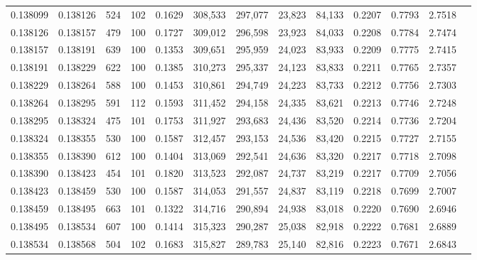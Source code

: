 \begin{tabular}{rrrrrrrrrrrrr}
0.138099 & 0.138126 &   524 & 102 &                                     0.1629 & 308,533 & 297,077 &  23,823 &  84,133 & 0.2207 & 0.7793 & 2.7518 \\
0.138126 & 0.138157 &   479 & 100 &                                     0.1727 & 309,012 & 296,598 &  23,923 &  84,033 & 0.2208 & 0.7784 & 2.7474 \\
0.138157 & 0.138191 &   639 & 100 &                                     0.1353 & 309,651 & 295,959 &  24,023 &  83,933 & 0.2209 & 0.7775 & 2.7415 \\
0.138191 & 0.138229 &   622 & 100 &                                     0.1385 & 310,273 & 295,337 &  24,123 &  83,833 & 0.2211 & 0.7765 & 2.7357 \\
0.138229 & 0.138264 &   588 & 100 &                                     0.1453 & 310,861 & 294,749 &  24,223 &  83,733 & 0.2212 & 0.7756 & 2.7303 \\
0.138264 & 0.138295 &   591 & 112 &                                     0.1593 & 311,452 & 294,158 &  24,335 &  83,621 & 0.2213 & 0.7746 & 2.7248 \\
0.138295 & 0.138324 &   475 & 101 &                                     0.1753 & 311,927 & 293,683 &  24,436 &  83,520 & 0.2214 & 0.7736 & 2.7204 \\
0.138324 & 0.138355 &   530 & 100 &                                     0.1587 & 312,457 & 293,153 &  24,536 &  83,420 & 0.2215 & 0.7727 & 2.7155 \\
0.138355 & 0.138390 &   612 & 100 &                                     0.1404 & 313,069 & 292,541 &  24,636 &  83,320 & 0.2217 & 0.7718 & 2.7098 \\
0.138390 & 0.138423 &   454 & 101 &                                     0.1820 & 313,523 & 292,087 &  24,737 &  83,219 & 0.2217 & 0.7709 & 2.7056 \\
0.138423 & 0.138459 &   530 & 100 &                                     0.1587 & 314,053 & 291,557 &  24,837 &  83,119 & 0.2218 & 0.7699 & 2.7007 \\
0.138459 & 0.138495 &   663 & 101 &                                     0.1322 & 314,716 & 290,894 &  24,938 &  83,018 & 0.2220 & 0.7690 & 2.6946 \\
0.138495 & 0.138534 &   607 & 100 &                                     0.1414 & 315,323 & 290,287 &  25,038 &  82,918 & 0.2222 & 0.7681 & 2.6889 \\
0.138534 & 0.138568 &   504 & 102 &                                     0.1683 & 315,827 & 289,783 &  25,140 &  82,816 & 0.2223 & 0.7671 & 2.6843 \\

\end{tabular}
